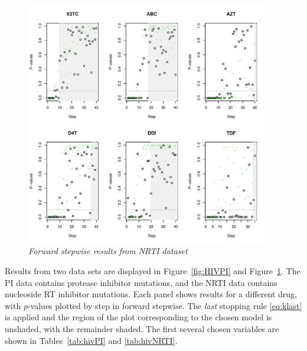 \documentclass{imsart}
\begin{document}
\begin{figure}[!htp]
\begin{center}
\includegraphics[width=0.95\textwidth]{../figs/HIV_NRTI.pdf}
\caption{\small \it Forward stepwise results from NRTI dataset}
\label{fig:HIVNRTI}
\end{center}
\end{figure}

Results from two data sets are displayed in Figure~\ref{fig:HIVPI} and
Figure~\ref{fig:HIVNRTI}. The PI data contains protease inhibitor
mutations, and the NRTI data contains nucleoside RT inhibitor mutations.
Each panel shows results for a different drug,
with $p$-values plotted by step in forward stepwise. 
The \textit{last} stopping rule \eqref{eq:klast} is applied and the region of the plot
corresponding to the chosen model is unshaded, with the remainder shaded.
The first several chosen variables are shown in Tables~\ref{tab:hivPI} and
\ref{tab:hivNRTI}.




\end{document}
